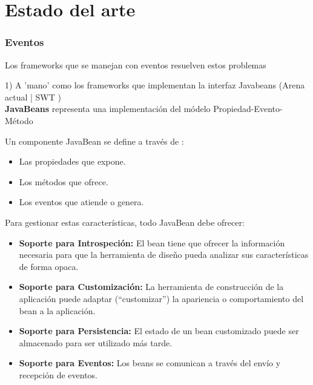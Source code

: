 \section{Estado del arte}
\label{sec:StateOfTheArt}


\subsubsection{Eventos}

Los frameworks que se manejan con eventos resuelven estos problemas 

1) A 'mano' como los frameworks que implementan la interfaz Javabeans (Arena
actual | SWT )\\ 


{\bf JavaBeans} representa una implementación del módelo Propiedad-Evento-Método

Un componente JavaBean se define a través de :

\begin {itemize}

\item Las propiedades que expone.
\item Los métodos que ofrece.
\item Los eventos que atiende o genera.

\end {itemize}

Para gestionar estas características, todo JavaBean debe ofrecer:

\begin {itemize}

\item {\bf Soporte para Introspeción:} El bean tiene que ofrecer la
información necesaria para que la herramienta de diseño pueda analizar sus características de forma opaca.

\item {\bf Soporte para Customización:} La herramienta de construcción de la
aplicación puede adaptar (“customizar”) la apariencia o comportamiento del bean a la  aplicación.

\item {\bf Soporte para Persistencia:} El estado de un bean customizado puede
ser almacenado para ser utilizado más tarde.

\item {\bf Soporte para Eventos:} Los beans se comunican a través del envío y
	  recepción de eventos.

\end {itemize}

